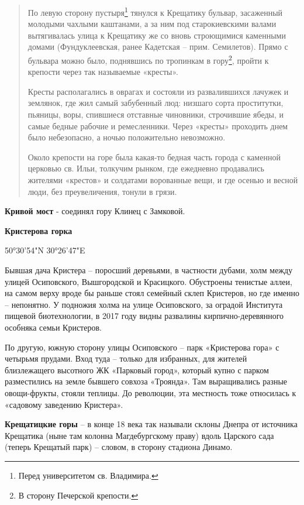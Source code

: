 \begin{quotation}
По левую сторону пустыря\footnote{Перед университетом св. Владимира.} тянулся к Крещатику бульвар, засаженный молодыми чахлыми каштанами, а за ним под старокиевскими валами вытягивалась улица к Крещатику же со вновь строющимися каменными домами (Фундуклеевская, ранее Кадетская – прим. Семилетов). Прямо с бульвара можно было, поднявшись по тропинкам в гору\footnote{В сторону Печерской крепости.}, пройти к крепости через так называемые «кресты».

Кресты располагались в оврагах и состояли из развалившихся лачужек и землянок, где жил самый забубенный люд: низшаго сорта проститутки, пьяницы, воры, спившиеся отставные чиновники, строчившие ябеды, и самые бедные рабочие и ремесленники. Через «кресты» проходить днем было небезопасно, а ночью положительно невозможно.

Около крепости на горе была какая-то бедная часть города с каменной церковью св. Ильи, толкучим рынком, где ежедневно продавались жителями «крестов» и солдатами ворованные вещи, и где осенью и весной люди, без преувеличения, тонули в грязи.
\end{quotation}


\medskip

\textbf{Кривой мост} - соединял гору Клинец с Замковой.\\

\medskip

\textbf{Кристерова горка} 

50°30'54"N 30°26'47"E

Бывшая дача Кристера – поросший деревьями, в частности дубами, холм между улицей Осиповского, Вышгородской и Красицкого. Обустроены тенистые аллеи, на самом верху вроде бы раньше стоял семейный склеп Кристеров, но где именно – непонятно. У подножия холма на улице Осиповского, за оградой Института пищевой биотехнологии, в 2017 году видны развалины кирпично-деревянного особняка семьи Кристеров.

По другую, южную сторону улицы Осиповского – парк «Кристерова гора» с четырьмя прудами. Вход туда – только для избранных, для жителей близлежащего высотного ЖК «Парковый город», который купно с парком разместились на земле бывшего совхоза «Троянда». Там выращивались разные овощи-фрукты, стояли теплицы. До революции, эта местность тоже относилась к «садовому заведению Кристера».\\


\medskip

\textbf{Крещатицкие горы} – в конце 18 века так называли склоны Днепра от источника Крещатика (ныне там колонна Магдебургскому праву) вдоль Царского сада (теперь Крещатый парк) – словом, в сторону стадиона Динамо.\\

